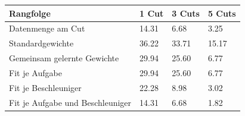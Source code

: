\begin{tabular}{@{}llll@{}}
\toprule
Rangfolge & 1 Cut & 3 Cuts & 5 Cuts \\
\midrule
Datenmenge am Cut & 14.31 & 6.68 & 3.25 \\
Standardgewichte & 36.22 & 33.71 & 15.17 \\
Gemeinsam gelernte Gewichte & 29.94 & 25.60 & 6.77 \\
Fit je Aufgabe & 29.94 & 25.60 & 6.77 \\
Fit je Beschleuniger & 22.28 & 8.98 & 3.02 \\
Fit je Aufgabe und Beschleuniger & 14.31 & 6.68 & 1.82 \\
\bottomrule
\end{tabular}
